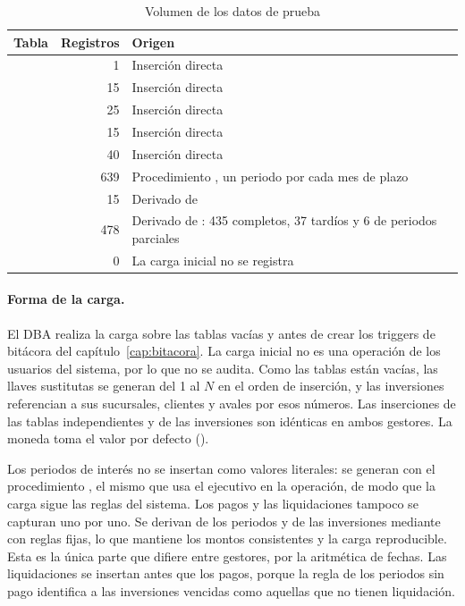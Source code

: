 \begin{table}[H]
	\centering
	\small
	\caption{Volumen de los datos de prueba}
	\label{tab:volumen-prueba}
	\begin{tabular}{@{}l r L{9.5cm}@{}}
		\toprule
		\textbf{Tabla} & \textbf{Registros} & \textbf{Origen} \\
		\midrule
		 & 1 & Inserción directa \\
		 & 15 & Inserción directa \\
		 & 25 & Inserción directa \\
		 & 15 & Inserción directa \\
		 & 40 & Inserción directa \\
		 & 639 & Procedimiento ,
		un periodo por cada mes de plazo \\
		 & 15 & Derivado de  \\
		 & 478 & Derivado de : 435 completos, 37
		tardíos y 6 de periodos parciales \\
		 & 0 & La carga inicial no se registra \\
		\bottomrule
	\end{tabular}
\end{table}

\paragraph{Forma de la carga.} El DBA realiza la carga sobre las tablas vacías y antes de crear los triggers de bitácora del capítulo~\ref{cap:bitacora}. La carga inicial no es una operación de los usuarios del sistema, por lo que no se audita. Como las tablas están vacías, las llaves sustitutas se generan del 1 al $N$ en el orden de inserción, y las inversiones referencian a sus sucursales, clientes y avales por esos números. Las inserciones de las tablas independientes y de las inversiones son idénticas en ambos gestores. La moneda toma el valor por defecto ().

Los periodos de interés no se insertan como valores literales: se generan con el procedimiento , el mismo que usa el ejecutivo en la operación, de modo que la carga sigue las reglas del sistema. Los pagos y las liquidaciones tampoco se capturan uno por uno. Se derivan de los periodos y de las inversiones mediante  con reglas fijas, lo que mantiene los montos consistentes y la carga reproducible. Esta es la única parte que difiere entre gestores, por la aritmética de fechas. Las liquidaciones se insertan antes que los pagos, porque la regla de los periodos sin pago identifica a las inversiones vencidas como aquellas que no tienen liquidación.

